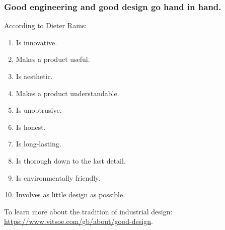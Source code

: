 \documentclass{beamer} %
\begin{document}
\begin{frame}

\frametitle{Good engineering and good design go hand in hand.}

According to Dieter Rams:
\begin{enumerate}
\item Is innovative.
\item Makes a product useful.
\item Is aesthetic.
\item Makes a product understandable.
\item Is unobtrusive.
\item Is honest.
\item Is long-lasting.
\item Is thorough down to the last detail.
\item Is environmentally friendly.
\item Involves as little design as possible.
\end{enumerate}

To learn more about the tradition of industrial design: \\ \url{https://www.vitsoe.com/gb/about/good-design}.

\end{frame}



\end{document}
